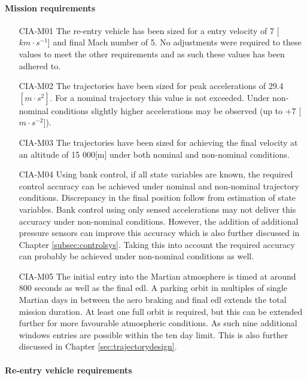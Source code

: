 \paragraph{Mission requirements}
\begin{itemize}[leftmargin=+20mm]
\item[CIA-M01]	The re-entry vehicle has been sized for a entry velocity of 7 [$km \cdot s^{-1}$] and final Mach number of 5. No adjustments were required to these values to meet the other requirements and as such these values has been adhered to. 
\item[CIA-M02]	The trajectories have been sized for peak accelerations of 29.4 $[m \cdot s^{2}]$. For a nominal trajectory this value is not exceeded. Under non-nominal conditions slightly higher accelerations may be observed (up to +7 [$m \cdot s ^{-2}$]). 
\item[CIA-M03]  The trajectories have been sized for achieving the final velocity at an altitude of 15 000[m] under both nominal and non-nominal conditions.
\item[CIA-M04]	Using bank control, if all state variables are known, the required control accuracy can be achieved under nominal and non-nominal trajectory conditions. Discrepancy in the final position follow from estimation of state variables. Bank control using only sensed accelerations may not deliver this accuracy under non-nominal conditions. However, the addition of additional pressure sensors can improve this accuracy which is also further discussed in Chapter \ref{subsec:controlsys}. Taking this into account the required accuracy can probably be achieved under non-nominal conditions as well.
\item[CIA-M05] The initial entry into the Martian atmosphere is timed at around 800 seconds as well as the final \gls{edl}. A parking orbit in multiples of single Martian days in between the aero braking and final \gls{edl} extends the total mission duration. At least one full orbit is required, but this can be extended further for more favourable atmospheric conditions. As such nine additional windows entries are possible within the ten day limit. This is also further discussed  in Chapter \ref{sec:trajectorydesign}.

\end{itemize}

\paragraph{Re-entry vehicle requirements}


